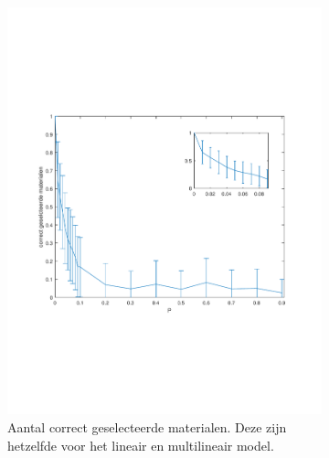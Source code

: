 \documentclass[12pt]{report}
\newcommand{\rulesep}{\unskip\ \vrule height -1ex\ }
\begin{document}
\begin{figure}

\begin{subfigure}[b]{0.5\textwidth}
\includegraphics[width=\textwidth,trim=0 200 0 175 cm]{PMC_10_100_corr.pdf}
\caption{Aantal correct geselecteerde materialen. Deze zijn hetzelfde voor het lineair en multilineair model. \label{fig:corr}}
\end{subfigure} \rulesep
\begin{subfigure}[b]{0.5\textwidth}

\end{subfigure}
\end{figure}
\end{document}
